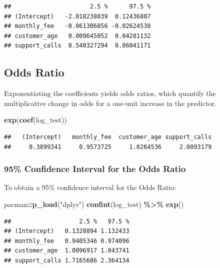\documentclass[
]{article}
\newenvironment{Shaded}{\begin{snugshade}}{\end{snugshade}}
\newcommand{\FunctionTok}[1]{\textcolor[rgb]{0.13,0.29,0.53}{\textbf{#1}}}
\newcommand{\NormalTok}[1]{#1}
\newcommand{\SpecialCharTok}[1]{\textcolor[rgb]{0.81,0.36,0.00}{\textbf{#1}}}
\newcommand{\StringTok}[1]{\textcolor[rgb]{0.31,0.60,0.02}{#1}}
\begin{document}
\begin{verbatim}
##                      2.5 %      97.5 %
## (Intercept)   -2.018238039  0.12436807
## monthly_fee   -0.061306856 -0.02624538
## customer_age   0.009645052  0.04281132
## support_calls  0.540327294  0.86041171
\end{verbatim}

\subsection{Odds Ratio}\label{odds-ratio}

Exponentiating the coefficients yields odds ratios, which quantify the
multiplicative change in odds for a one‑unit increase in the predictor.

\begin{Shaded}
\begin{Highlighting}[]
\FunctionTok{exp}\NormalTok{(}\FunctionTok{coef}\NormalTok{(log\_test))}
\end{Highlighting}
\end{Shaded}

\begin{verbatim}
##   (Intercept)   monthly_fee  customer_age support_calls 
##     0.3899341     0.9573725     1.0264536     2.0093179
\end{verbatim}

\subsubsection{95\% Confidence Interval for the Odds
Ratio}\label{confidence-interval-for-the-odds-ratio}

To obtain a 95\% confidence interval for the Odds Ratio:

\begin{Shaded}
\begin{Highlighting}[]
\NormalTok{pacman}\SpecialCharTok{::}\FunctionTok{p\_load}\NormalTok{(}\StringTok{"dplyr"}\NormalTok{)}
\FunctionTok{confint}\NormalTok{(log\_test) }\SpecialCharTok{\%\textgreater{}\%} \FunctionTok{exp}\NormalTok{()}
\end{Highlighting}
\end{Shaded}

\begin{verbatim}
##                   2.5 %   97.5 %
## (Intercept)   0.1328894 1.132433
## monthly_fee   0.9405346 0.974096
## customer_age  1.0096917 1.043741
## support_calls 1.7165686 2.364134
\end{verbatim}
\end{document}
